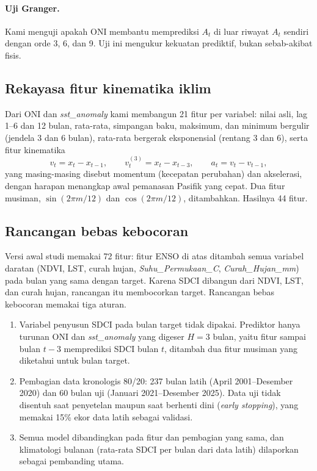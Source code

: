 \documentclass[11pt,twoside]{article}
\begin{document}
\paragraph{Uji Granger.} Kami menguji apakah ONI membantu memprediksi $A_t$ di luar riwayat $A_t$ sendiri \cite{granger1969causality} dengan orde 3, 6, dan 9. Uji ini mengukur kekuatan prediktif, bukan sebab-akibat fisis.

\subsection{Rekayasa fitur kinematika iklim}
\label{SubSec:Features}

Dari ONI dan \textit{sst\_anomaly} kami membangun 21 fitur per variabel: nilai asli, lag 1--6 dan 12 bulan, rata-rata, simpangan baku, maksimum, dan minimum bergulir (jendela 3 dan 6 bulan), rata-rata bergerak eksponensial (rentang 3 dan 6), serta fitur kinematika
\begin{equation}
v_t = x_t - x_{t-1}, \qquad v^{(3)}_t = x_t - x_{t-3}, \qquad a_t = v_t - v_{t-1},
\label{Eq:Kinematic}
\end{equation}
yang masing-masing disebut momentum (kecepatan perubahan) dan akselerasi, dengan harapan menangkap awal pemanasan Pasifik yang cepat. Dua fitur musiman, $\sin(2\pi m/12)$ dan $\cos(2\pi m/12)$, ditambahkan. Hasilnya 44 fitur.

\subsection{Rancangan bebas kebocoran}
\label{SubSec:Leakfree}

Versi awal studi memakai 72 fitur: fitur ENSO di atas ditambah semua variabel daratan (NDVI, LST, curah hujan, \textit{Suhu\_Permukaan\_C}, \textit{Curah\_Hujan\_mm}) pada bulan yang sama dengan target. Karena SDCI dibangun dari NDVI, LST, dan curah hujan, rancangan itu membocorkan target. Rancangan bebas kebocoran memakai tiga aturan.
\begin{enumerate}
\item Variabel penyusun SDCI pada bulan target tidak dipakai. Prediktor hanya turunan ONI dan \textit{sst\_anomaly} yang digeser $H = 3$ bulan, yaitu fitur sampai bulan $t - 3$ memprediksi SDCI bulan $t$, ditambah dua fitur musiman yang diketahui untuk bulan target.
\item Pembagian data kronologis 80/20: 237 bulan latih (April 2001--Desember 2020) dan 60 bulan uji (Januari 2021--Desember 2025). Data uji tidak disentuh saat penyetelan maupun saat berhenti dini (\textit{early stopping}), yang memakai 15\% ekor data latih sebagai validasi.
\item Semua model dibandingkan pada fitur dan pembagian yang sama, dan klimatologi bulanan (rata-rata SDCI per bulan dari data latih) dilaporkan sebagai pembanding utama.
\end{enumerate}
\end{document}
